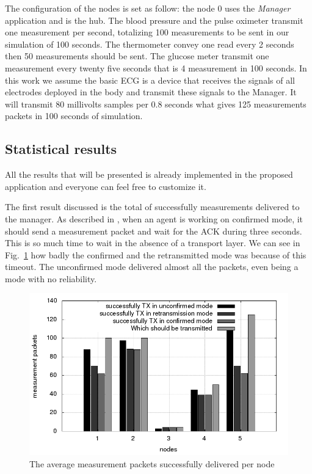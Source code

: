 The configuration of the nodes is set as follow: the node 0 uses the \textit{Manager} application and is the hub. The blood pressure and the pulse oximeter transmit one measurement per second, totalizing 100 measurements to be sent in our simulation of 100 seconds. The thermometer convey one read every 2 seconds then 50 measurements should be sent. The glucose meter  transmit one measurement every twenty five seconds that is 4 measurement in 100 seconds. In this work we assume the basic ECG is a device that receives the signals of all electrodes deployed in the body and transmit these signals to the Manager. It will transmit 80 millivolts samples per 0.8 seconds what gives 125 measurements packets in 100 seconds of simulation.

\subsection{Statistical results}

All the results that will be presented is already implemented in the proposed application and everyone can feel free to customize it. 

The first result discussed is the total of successfully measurements delivered to the manager. As described in \cite{b1}, when an agent is working on confirmed mode, it  should send a measurement packet and wait for the ACK during three seconds. This is so much time to wait in the absence of a transport layer. We can see in Fig.~\ref{fig:measurementreceivedpernode} how badly the confirmed and the retransmitted mode was because of this timeout. The unconfirmed mode delivered almost all the packets, even being a mode with no reliability.

\begin{figure}[htbp]
\centerline{\includegraphics[scale=0.4]{figures/averagemeasurementpacketreceivedpernode.png}}
\caption{The average measurement packets successfully delivered per node}
\label{fig:measurementreceivedpernode}
\end{figure}

